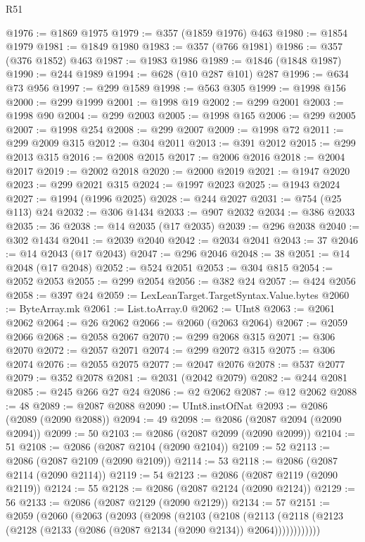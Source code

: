 \begin{lexlean}{R51}
\begin{coremodule}
@1976 := @1869 @1975
@1979 := @357 (@1859 @1976) @463
@1980 := @1854 @1979
@1981 := @1849 @1980
@1983 := @357 (@766 @1981)
@1986 := @357 (@376 @1852) @463
@1987 := @1983 @1986
@1989 := @1846 (@1848 @1987)
@1990 := @244 @1989
@1994 := @628 (@10 @287 @101) @287
@1996 := @634 @73 @956
@1997 := @299 @1589
@1998 := @563 @305
@1999 := @1998 @156
@2000 := @299 @1999
@2001 := @1998 @19
@2002 := @299 @2001
@2003 := @1998 @90
@2004 := @299 @2003
@2005 := @1998 @165
@2006 := @299 @2005
@2007 := @1998 @254
@2008 := @299 @2007
@2009 := @1998 @72
@2011 := @299 @2009 @315
@2012 := @304 @2011
@2013 := @391 @2012
@2015 := @299 @2013 @315
@2016 := @2008 @2015
@2017 := @2006 @2016
@2018 := @2004 @2017
@2019 := @2002 @2018
@2020 := @2000 @2019
@2021 := @1947 @2020
@2023 := @299 @2021 @315
@2024 := @1997 @2023
@2025 := @1943 @2024
@2027 := @1994 (@1996 @2025)
@2028 := @244 @2027
@2031 := @754 (@25 @113) @24
@2032 := @306 @1434
@2033 := @907 @2032
@2034 := @386 @2033
@2035 := 36
@2038 := @14 @2035 (@17 @2035)
@2039 := @296 @2038
@2040 := @302 @1434
@2041 := @2039 @2040
@2042 := @2034 @2041
@2043 := 37
@2046 := @14 @2043 (@17 @2043)
@2047 := @296 @2046
@2048 := 38
@2051 := @14 @2048 (@17 @2048)
@2052 := @524 @2051
@2053 := @304 @815
@2054 := @2052 @2053
@2055 := @299 @2054
@2056 := @382 @24
@2057 := @424 @2056
@2058 := @397 @24
@2059 := LexLeanTarget.TargetSyntax.Value.bytes
@2060 := ByteArray.mk
@2061 := List.toArray.{0}
@2062 := UInt8
@2063 := @2061 @2062
@2064 := @26 @2062
@2066 := @2060 (@2063 @2064)
@2067 := @2059 @2066
@2068 := @2058 @2067
@2070 := @299 @2068 @315
@2071 := @306 @2070
@2072 := @2057 @2071
@2074 := @299 @2072 @315
@2075 := @306 @2074
@2076 := @2055 @2075
@2077 := @2047 @2076
@2078 := @537 @2077
@2079 := @352 @2078
@2081 := @2031 (@2042 @2079)
@2082 := @244 @2081
@2085 := @245 @266 @27 @24
@2086 := @2 @2062
@2087 := @12 @2062
@2088 := 48
@2089 := @2087 @2088
@2090 := UInt8.instOfNat
@2093 := @2086 (@2089 (@2090 @2088))
@2094 := 49
@2098 := @2086 (@2087 @2094 (@2090 @2094))
@2099 := 50
@2103 := @2086 (@2087 @2099 (@2090 @2099))
@2104 := 51
@2108 := @2086 (@2087 @2104 (@2090 @2104))
@2109 := 52
@2113 := @2086 (@2087 @2109 (@2090 @2109))
@2114 := 53
@2118 := @2086 (@2087 @2114 (@2090 @2114))
@2119 := 54
@2123 := @2086 (@2087 @2119 (@2090 @2119))
@2124 := 55
@2128 := @2086 (@2087 @2124 (@2090 @2124))
@2129 := 56
@2133 := @2086 (@2087 @2129 (@2090 @2129))
@2134 := 57
@2151 := @2059
    (@2060
      (@2063
        (@2093
          (@2098
            (@2103
              (@2108
                (@2113
                  (@2118 (@2123 (@2128 (@2133 (@2086 (@2087 @2134 (@2090 @2134)) @2064))))))))))))

\end{coremodule}
\end{lexlean}
